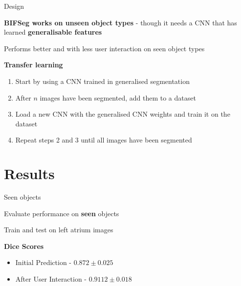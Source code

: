 \documentclass[10pt]{beamer}
\begin{document}
\begin{frame}[fragile]{Design}

  \textbf{BIFSeg works on unseen object types} - though it
  needs a CNN that has learned \textbf{generalisable features}

  Performs better and with less user interaction on seen object types

  \pause
  \textbf{Transfer learning}
  \begin{enumerate}
  \item Start by using a CNN trained in generalised segmentation
  \item After $n$ images have been segmented, add them to a dataset
  \item Load a new CNN with the generalised CNN weights and train it on the dataset
  \item Repeat steps 2 and 3 until all images have been segmented
  \end{enumerate}

  
\end{frame}




\section{Results}

\begin{frame}[fragile]{Seen objects}

  Evaluate performance on \textbf{seen} objects

  Train and test on left atrium images

  \textbf{Dice Scores}
  \begin{itemize}
  \item Initial Prediction - $0.872 \pm 0.025$
  \item After User Interaction - $0.9112 \pm 0.018$
  \end{itemize}
  
\end{frame}
\end{document}
